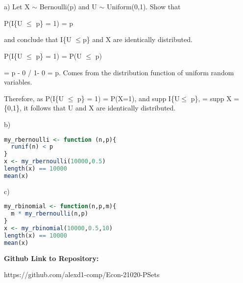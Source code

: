 \newpage
\section{}

a) Let X $\sim$ Bernoulli(p) and U $\sim$ Uniform(0,1). Show that

P(I{\{U $\leq$ p}\} = 1) = p

and conclude that I\{U $\leq$p\} and X are identically distributed. 

P(I{\{U $\leq$ p}\} = 1) = P(U $\leq$ p)

= p - 0 / 1- 0  = p. Comes from the distribution function of uniform random variables.

Therefore, as P(I{\{U $\leq$ p}\} = 1) = P(X=1), and supp I\{U$\leq$ p\}, = supp X = \{0,1\}, it follows that U and X are identically distributed.

b)

\begin{lstlisting}[language=R]
my_rbernoulli <- function (n,p){
  runif(n) < p
}
x <- my_rbernoulli(10000,0.5)
length(x) == 10000
mean(x)
\end{lstlisting}

c)

\begin{lstlisting}[language=R]
my_rbinomial <- function(n,p,m){
  m * my_rbernoulli(n,p)
}
x <- my_rbinomial(10000,0.5,10)
length(x) == 10000
mean(x)
\end{lstlisting}


\newpage
\textbf{Github Link to Repository:}

https://github.com/alexd1-comp/Econ-21020-PSets





